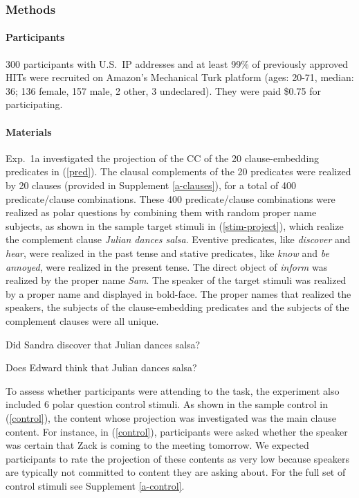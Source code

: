 \documentclass[11pt,fleqn]{article}
\newcommand{\6}{\mbox{$[\hspace*{-.6mm}[$}}
\newcommand{\9}{\mbox{$]\hspace*{-.6mm}]$}}
\begin{document}
\subsubsection{Methods}

\paragraph{Participants} 300 participants with U.S.\ IP addresses and at least 99\% of previously approved HITs were recruited on Amazon's Mechanical Turk platform (ages: 20-71, median: 36; 136 female, 157 male, 2 other, 3 undeclared). They were paid \$0.75 for participating.

\paragraph{Materials} Exp.~1a investigated the projection of the CC of the 20 clause-embedding predicates in (\ref{pred}).  The clausal complements of the 20 predicates were realized by 20 clauses (provided in Supplement \ref{a-clauses}), for a total of 400 predicate/clause combinations. These 400 predicate/clause combinations were realized as polar questions by combining them with random proper name subjects, as shown in the sample target stimuli in (\ref{stim-project}), which realize the complement clause {\em Julian dances salsa}. Eventive predicates, like {\em discover} and {\em hear}, were realized in the past tense and stative predicates, like {\em know} and {\em be annoyed}, were realized in the present tense. The direct object of {\em inform} was realized by the proper name {\em Sam}.  The speaker of the target stimuli was realized by a proper name and displayed in bold-face. The proper names that realized the speakers, the subjects of the clause-embedding predicates and the subjects of the complement clauses were all unique.

\begin{exe}
\ex\label{stim-project} 
\begin{xlist}
 Did Sandra discover that Julian dances salsa?

 Does Edward think that Julian dances salsa?
\end{xlist}
\end{exe}

To assess whether participants were attending to the task, the experiment also included 6 polar question control stimuli. As shown in the sample control in (\ref{control}), the content whose projection was investigated was the main clause content. For instance, in (\ref{control}), participants were asked whether the speaker was certain that Zack is coming to the meeting tomorrow. We expected participants to rate the projection of these contents as very low because speakers are typically not committed to content they are asking about. For the full set of control stimuli see Supplement \ref{a-control}.
\end{document}
